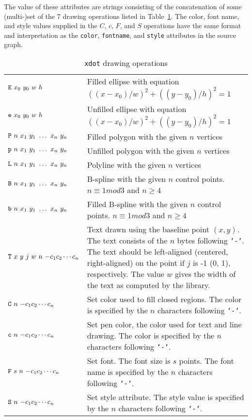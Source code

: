 The value of these attributes are strings consisting of the concatenation of 
some (multi-)set of the 7 drawing operations listed in Table~\ref{table:xops}. 
The color, font name, and style values supplied in the $C$, $c$, $F$,
and $S$ operations have the same format and interpretation
as the {\tt color}, {\tt fontname}, and
{\tt style} attributes in the source graph.
\begin{table}[htb]
\centering
\begin{tabular}[t]{|lp{4.5in}|} \hline
${\tt E}\ x_0\ y_0\ w\ h$ &  Filled ellipse with equation
$((x - x_0)/w)^2 + ((y - y_0)/h)^2 = 1$ \\
${\tt e}\ x_0\ y_0\ w\ h$ & Unfilled ellipse with equation
$((x - x_0)/w)^2 + ((y - y_0)/h)^2 = 1$ \\
${\tt P}\ n\ x_1\ y_1\ \ldots\ x_n\ y_n$ & Filled polygon with the
given $n$ vertices \\
${\tt p}\ n\ x_1\ y_1\ \ldots\ x_n\ y_n$ & Unfilled polygon with the
given $n$ vertices \\
${\tt L}\ n\ x_1\ y_1\ \ldots\ x_n\ y_n$ & Polyline with the
given $n$ vertices \\
${\tt B}\ n\ x_1\ y_1\ \ldots\ x_n\ y_n$ & B-spline with the
given $n$ control points. $n \equiv 1 mod 3$ and $n \geq 4$ \\
${\tt b}\ n\ x_1\ y_1\ \ldots\ x_n\ y_n$ & Filled B-spline with the
given $n$ control points. $n \equiv 1 mod 3$ and $n \geq 4$ \\
${\tt T}\ x\ y\ j\ w\ n\ {\tt -}c_{1}c_{2}\cdots c_{n}$ &
Text drawn using the baseline point $(x,y)$. The text consists of the 
$n$ bytes following {\tt '-'}. The text should be left-aligned (centered,
right-aligned) on the point if $j$ is -1 (0, 1), respectively. The 
value $w$ gives the width of the text as computed by the library.  \\
${\tt C}\ n\ {\tt -}c_{1}c_{2}\cdots c_{n}$ & Set color used to fill closed
regions. The
color is specified by the $n$ characters following {\tt '-'}. \\
${\tt c}\ n\ {\tt -}c_{1}c_{2}\cdots c_{n}$ & Set pen color, the color used
for text and line drawing. The
color is specified by the $n$ characters following {\tt '-'}. \\
${\tt F}\ s\ n\ {\tt -}c_{1}c_{2}\cdots c_{n}$ & Set font. The font
size is $s$ points. The font name
is specified by the $n$ characters following {\tt '-'}. \\
${\tt S}\ n\ {\tt -}c_{1}c_{2}\cdots c_{n}$ & Set style attribute. The
style value is specified by the $n$ characters following {\tt '-'}. \\
\hline
\end{tabular}
\caption{{\tt xdot} drawing operations}
\label{table:xops}
\end{table}

